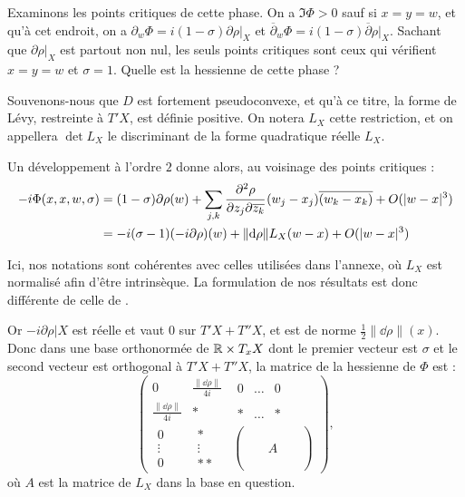 Examinons les points critiques de cette phase. On a $\Im \Phi >0$ sauf si $x=y=w$, et qu'à cet endroit, on a $\partial_w\Phi = i(1-\sigma)\partial \rho|_X$ et $\overline{\partial}_w\Phi=i(1-\sigma)\overline{\partial}\rho|_X$. Sachant que $\partial \rho|_X$ est partout non nul, les seuls points critiques sont ceux qui vérifient $x=y=w$ et $\sigma =1$.
Quelle est la hessienne de cette phase ? 

Souvenons-nous que $D$ est fortement pseudoconvexe, et qu'à ce titre, la forme de Lévy, restreinte à $T'X$, est définie positive. On notera $L_X$ cette restriction, et on appellera $\det L_X$ le discriminant de la forme quadratique réelle $L_X$. 

Un développement à l'ordre $2$ donne alors, au voisinage des points critiques :
\begin{align*}
  -i\Phi(x,x,w,\sigma)&=(1-\sigma) \partial\rho(w) + \sum_{j,k}\cfrac{\partial^2\rho}{\partial z_j\partial \overline{z_k}}\,(w_j-x_j)\overline{(w_k-x_k)} + O(|w-x|^3)\\
  &= -i(\sigma-1) (-i\partial\rho)(w) + \|\mathrm{d}\rho\|L_{X}(w-x) + O(|w-x|^3)
\end{align*}

\begin{rem}
Ici, nos notations sont cohérentes avec celles utilisées dans l'annexe, où $L_X$ est normalisé afin d'être intrinsèque. La formulation de nos résultats est donc différente de celle de \cite{BoutetdeMonvel1975}.
\end{rem}

Or $-i\partial \rho|X$ est réelle et vaut $0$ sur $T'X+T''X$, et est de norme $\frac 12 \|\dd\rho\|(x)$. Donc dans une base orthonormée de $\mathbb{R}\times T_xX$ dont le premier vecteur est $\sigma$ et le second vecteur est orthogonal à $T'X+T''X$, la matrice de la hessienne de $\Phi$ est :
\begin{equation*}
\begin{pmatrix}
  0 & \frac{\|\dd\rho\|}{4i} &\begin{matrix}0&\ldots & 0\end{matrix}\\
  \frac{\|\dd\rho\|}{4i} & * & \begin{matrix}*&\ldots & *\end{matrix}\\
  \begin{matrix}0\\\vdots\\0\end{matrix}& \begin{matrix}*\\\vdots\\** \end{matrix}&\begin{pmatrix}\phantom{A}&\phantom{A}&\phantom{A}\\\phantom{A}&A&\phantom{A}\\\phantom{A}&\phantom{A}&\phantom{A}\end{pmatrix}
\end{pmatrix},
\end{equation*}
où $A$ est la matrice de $L_X$ dans la base en question. 

